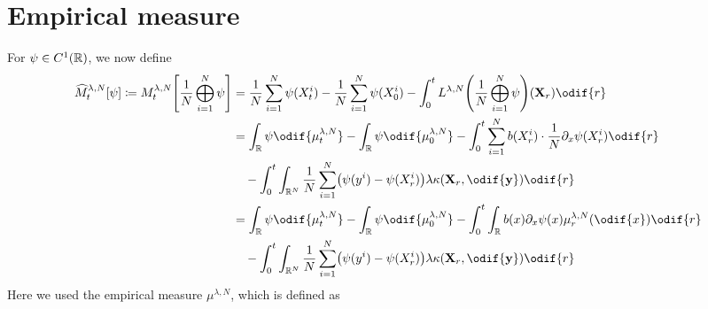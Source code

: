 \section{Empirical measure}

\noindent For \(\psi \in C^1(\mathbb{R})\), we now define
\begin{equation}\label{eq:hat-M-derivation-start}
  \begin{split}
    \widehat{M}_t^{\lambda, N}[\psi] \coloneqq
    M_t^{\lambda, N}\sbr*{\frac{1}{N} \bigoplus_{i=1}^N \psi}
     & = \frac{1}{N} \sum_{i=1}^N \psi(X_t^i) - \frac{1}{N} \sum_{i=1}^N \psi(X_0^i) - \int_0^t L^{\lambda, N} \br*{\frac{1}{N}\bigoplus_{i=1}^N \psi} (\bm{X}_r) \odif{r} \\
     & = \int_\potspace \psi \odif{\mu_t^{\lambda, N}} - \int_\potspace \psi \odif{\mu_0^{\lambda, N}}
    - \int_0^t \sum_{i=1}^N b(X_{r}^i) \cdot \frac{1}{N} \partial_{x} \psi(X_{r}^i) \odif{r}                                                                               \\
     & \quad - \int_0^t \int_{\potspace^N} \frac{1}{N} \sum_{i=1}^N \br*{ \psi(y^i) - \psi(X_{r}^i) } \lambda \kappa(\bm{X}_r, \odif{\bm{y}}) \odif{r}                     \\
     & = \int_\potspace \psi \odif{\mu_t^{\lambda, N}} - \int_\potspace \psi \odif{\mu_0^{\lambda, N}}
    - \int_0^t \int_\potspace b(x) \partial_{x} \psi(x) \mu_r^{\lambda, N}(\odif{x}) \odif{r}                                                                              \\
     & \quad - \int_0^t \int_{\potspace^N} \frac{1}{N} \sum_{i=1}^N \br*{ \psi(y^i) - \psi(X_{r}^i) } \lambda \kappa(\bm{X}_r, \odif{\bm{y}}) \odif{r}                     \\
  \end{split}
\end{equation}
Here we used the empirical measure \(\mu^{\lambda,N}\), which is defined as

